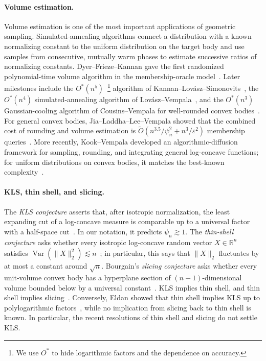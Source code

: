 \documentclass[11pt]{article}
\theoremstyle{definition}
\theoremstyle{remark}
\newcommand{\R}{\mathbb R}
\begin{document}
\paragraph{Volume estimation.}
Volume estimation is one of the most important applications of geometric sampling.  Simulated-annealing algorithms connect a distribution with a known normalizing constant to the uniform distribution on the target body and use samples from consecutive, mutually warm phases to estimate successive ratios of normalizing constants. Dyer--Frieze--Kannan gave the first randomized polynomial-time volume algorithm in the membership-oracle model~\cite{DFK91}. Later milestones include the $O^*(n^5)$~\footnote{We use $O^*$ to hide logarithmic factors and the dependence on accuracy.} algorithm of Kannan--Lov\'asz--Simonovits~\cite{KLS97}, the $O^*(n^4)$ simulated-annealing algorithm of Lov\'asz--Vempala~\cite{LVVolume}, and the $O^*(n^3)$ Gaussian-cooling algorithm of Cousins--Vempala for well-rounded convex bodies~\cite{CV18}. For general convex bodies, Jia--Laddha--Lee--Vempala showed that the combined cost of rounding and volume estimation is $\widetilde O(n^{3.5}/\psi_n^2+n^3/\varepsilon^2)$ membership queries~\cite{JLLV26}.  More recently, Kook--Vempala developed an algorithmic-diffusion framework for sampling, rounding, and integrating general log-concave functions; for uniform distributions on convex bodies, it matches the best-known complexity~\cite{KookVempalaDiffusion}.

\paragraph{KLS, thin shell, and slicing.}
The \emph{KLS conjecture} asserts that, after isotropic normalization, the least expanding cut of a log-concave measure is comparable up to a universal factor with a half-space cut~\cite{KLS95}.  In our notation, it predicts $\psi_n\gtrsim1$. The \emph{thin-shell conjecture} asks whether every isotropic log-concave random vector $X\in\R^n$ satisfies $\operatorname{Var}(\|X\|_2^2)\lesssim n$~\cite{anttila2003central,bobkov2004central}; in particular, this says that $\|X\|_2$ fluctuates by at most a constant around $\sqrt n$. Bourgain's \emph{slicing conjecture} asks whether every unit-volume convex body has a hyperplane section of $(n-1)$-dimensional volume bounded below by a universal constant~\cite{bourgain1986high}. KLS implies thin shell, and thin shell implies slicing~\cite{EldanKlartagThinSlice}.  Conversely, Eldan showed that thin shell implies KLS up to polylogarithmic factors~\cite{EldanSL}, while no implication from slicing back to thin shell is known.  In particular, the recent resolutions of thin shell and slicing do not settle KLS.  
\end{document}

